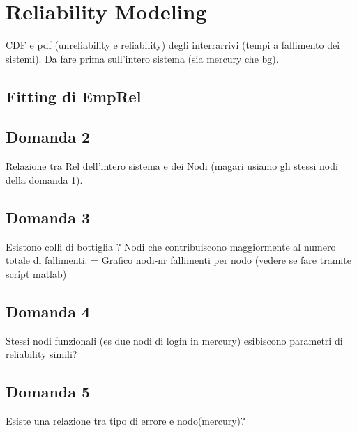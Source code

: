\section{Reliability Modeling}
CDF e pdf (unreliability e reliability) degli interrarrivi (tempi a fallimento dei sistemi). Da fare prima sull'intero sistema (sia mercury che bg).
\subsection{Fitting di EmpRel}
\subsection{Domanda 2}
Relazione tra Rel dell'intero sistema e dei Nodi (magari usiamo gli stessi nodi della domanda 1).
\subsection{Domanda 3}
Esistono colli di bottiglia ? Nodi che contribuiscono maggiormente al numero totale di fallimenti. = Grafico nodi-nr fallimenti per nodo (vedere se fare tramite script matlab)
\subsection{Domanda 4}
Stessi nodi funzionali (es due nodi di login in mercury) esibiscono parametri di reliability simili?
\subsection{Domanda 5}
Esiste una relazione tra tipo di errore e nodo(mercury)?

